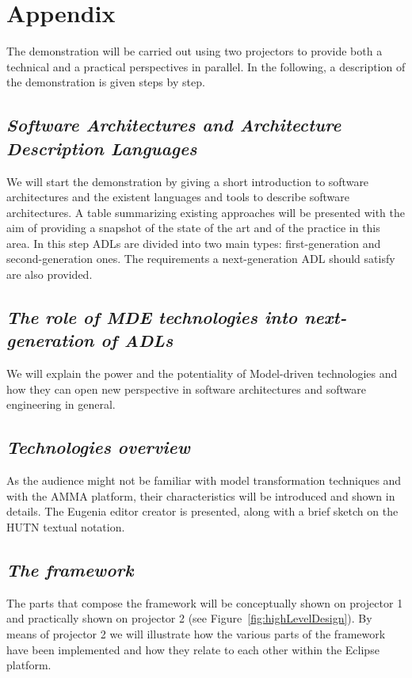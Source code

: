 
\section{Appendix} 

The demonstration will be carried out using two projectors to
provide both a technical and a practical perspectives in parallel.
In the following, a description of the demonstration is given steps
by step.

\subsection{\em Software Architectures and Architecture Description Languages}
We will start the demonstration by giving a short introduction to
software architectures and the existent languages and tools to
describe software architectures. A table summarizing existing
approaches will be presented with the aim of providing a snapshot of
the state of the art and of the practice in this area.
In this step ADLs are divided into two main types: first-generation and second-generation ones.
The requirements a next-generation ADL should satisfy are also provided.

\subsection{\em The role of MDE technologies into next-generation of ADLs}
We will explain the power and the potentiality of Model-driven
technologies and how they can open new perspective in software
architectures and software engineering in general.

\subsection{\em Technologies overview}
 As the audience might not be
familiar with model transformation techniques and with the AMMA
platform, their characteristics will be introduced and shown in
details. The Eugenia editor creator is presented, along with  a brief sketch on
the HUTN textual notation.

\subsection{\em The \name{} framework}
The parts that compose the \name{} framework will be conceptually
shown on projector 1 and practically shown on projector 2 (see
Figure~\ref{fig:highLevelDesign}). By means of projector 2 we will
illustrate how the various parts of the \name{} framework have been implemented
and how they relate to each other within the Eclipse platform.

